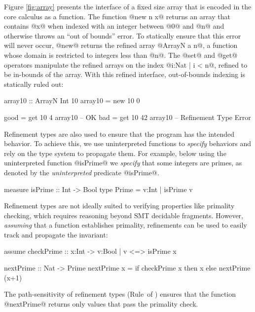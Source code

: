 Figure \ref{fig:array} presents the interface of a fixed size array
that is encoded in the core calculus \sysrf as a function.
%
The function @new n x@ returns an array that contains
@x@ when indexed with an integer between @0@ and @n@
and otherwise throws an ``out of bounds'' error.
To statically ensure that this error will never occur,
@new@ returns the refined array @ArrayN a n@, \ie
a function whose domain is restricted to integers less than @n@.
%
The @set@ and @get@ operators manipulate the refined arrays
on the index @i:{Nat | i < n}@, \ie refined to be in-bounds of the array.
%
With this refined interface, out-of-bounds indexing is statically ruled out:
\begin{code}
  array10 :: ArrayN Int 10
  array10 = new 10 0

  good = get 10 4  array10 -- OK
  bad  = get 10 42 array10 -- Refinement Type Error
\end{code}

Refinement types are also used to ensure that the program has the intended behavior.
To achieve this, we use uninterpreted functions to \textit{specify} behaviors
and rely on the type system to propagate them.
For example, below using the uninterpreted function @isPrime@ we \textit{specify}
that some integers are primes, as denoted by the \emph{uninterpreted} predicate @isPrime@.
%
\begin{code}
  measure isPrime :: Int -> Bool
  type Prime = {v:Int | isPrime v}
\end{code}
%
Refinement types are not ideally suited to verifying properties
like primality checking, which requires reasoning beyond SMT
decidable fragments.
%
However, \emph{assuming} that a function establishes primality,
refinements can be used to easily track and propagate the invariant:
%
\begin{code}
  assume checkPrime :: x:Int -> {v:Bool | v <=> isPrime x}

  nextPrime :: Nat -> Prime
  nextPrime x = if checkPrime x then x else nextPrime (x+1)
\end{code}
%
The path-sensitivity of refinement types (Rule~\tIf of )
ensures that the function @nextPrime@ returns only
values that pass the primality check.

